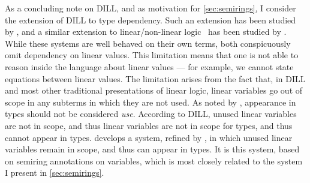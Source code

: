 As a concluding note on DILL, and as motivation for \cref{sec:semirings}, I
consider the extension of DILL to type dependency.
Such an extension has been studied by \citet{Vakar14}, and a similar extension
to linear/non-linear logic~\citep{Benton94} has been studied by \citet{KPB15}.
While these systems are well behaved on their own terms, both conspicuously omit
dependency on linear values.
This limitation means that one is not able to reason inside the language about
linear values --- for example, we cannot state equations between linear values.
The limitation arises from the fact that, in DILL and most other traditional
presentations of linear logic, linear variables go out of scope in any subterms
in which they are not used.
As noted by \citet{McBride16}, appearance in types should not be considered
\emph{use}.
According to DILL, unused linear variables are not in scope, and thus linear
variables are not in scope for types, and thus cannot appear in types.
 develops a system, refined by \citet{Atkey18}, in which unused
linear variables remain in scope, and thus can appear in types.
It is this system, based on semiring annotations on variables, which is
most closely related to the system I present in \cref{sec:semirings}.

